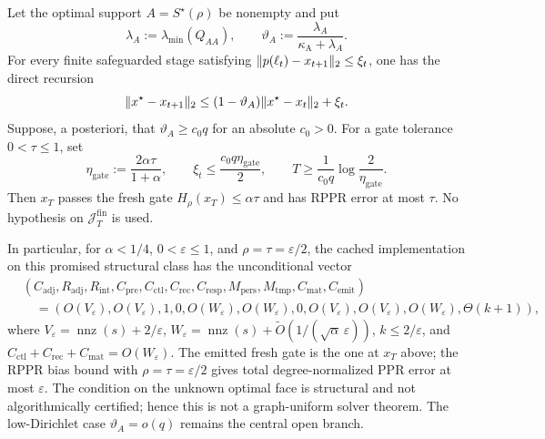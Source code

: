 \begin{theorem}
\label{thm:aesp-cd-high-dirichlet-branch}
Let the optimal support $A=S^\star(\rho)$ be nonempty and put
\begin{equation}
 \lambda_A:=\lambda_{\min}(Q_{AA}),
 \qquad
 \vartheta_A:=\frac{\lambda_A}
                    {\kappa_{\mathrm A}+\lambda_A}.
 \label{eq:aesp-cd-high-dirichlet-parameter}
\end{equation}
For every finite safeguarded stage satisfying
$\lVert p(\ell_t)-x_{t+1}\rVert_2\leq\xi_t$, one has the direct recursion
\begin{equation}
 \lVert x^\star-x_{t+1}\rVert_2
 \leq(1-\vartheta_A)\lVert x^\star-x_t\rVert_2+\xi_t.
 \label{eq:aesp-cd-high-dirichlet-recursion}
\end{equation}
Suppose, a posteriori, that
$\vartheta_A\geq c_0q$ for an absolute $c_0>0$.  For a gate tolerance
$0<\tau\leq1$, set
\begin{equation*}
 \eta_{\mathrm{gate}}:=\frac{2\alpha\tau}{1+\alpha},
 \qquad
 \xi_t\leq\frac{c_0q\eta_{\mathrm{gate}}}{2},
 \qquad
 T\geq\frac1{c_0q}
       \log\frac{2}{\eta_{\mathrm{gate}}}.
\end{equation*}
Then $x_T$ passes the fresh gate
$H_\rho(x_T)\leq\alpha\tau$ and has RPPR error at most $\tau$.
No hypothesis on $\mathcal J_T^{\mathrm{fin}}$ is used.

In particular, for $\alpha<1/4$, $0<\varepsilon\leq1$, and
$\rho=\tau=\varepsilon/2$, the cached implementation on this promised
structural class has the unconditional vector
\begin{equation}
 \begin{split}
 &(C_{\mathrm{adj}},R_{\mathrm{adj}},R_{\mathrm{int}},C_{\mathrm{pre}},
 C_{\mathrm{ctl}},C_{\mathrm{rec}},C_{\mathrm{resp}},M_{\mathrm{pers}},
 M_{\mathrm{tmp}},C_{\mathrm{mat}},C_{\mathrm{emit}})\\
 &\quad=
 (O(V_\varepsilon),O(V_\varepsilon),1,0,
 O(W_\varepsilon),O(W_\varepsilon),0,
 O(V_\varepsilon),O(V_\varepsilon),O(W_\varepsilon),\Theta(k+1)),
 \end{split}
 \label{eq:aesp-cd-high-dirichlet-vector}
\end{equation}
where
$V_\varepsilon=\operatorname{nnz}(s)+2/\varepsilon$,
$W_\varepsilon=\operatorname{nnz}(s)
+\widetilde O(1/(\sqrt\alpha\,\varepsilon))$,
$k\leq2/\varepsilon$, and
$C_{\mathrm{ctl}}+C_{\mathrm{rec}}+C_{\mathrm{mat}}=O(W_\varepsilon)$.
The emitted fresh gate is the one at $x_T$ above; the RPPR bias bound with
$\rho=\tau=\varepsilon/2$ gives total degree-normalized PPR error at most
$\varepsilon$.
The condition on the unknown optimal face is structural and not
algorithmically certified; hence this is not a graph-uniform solver theorem.
The low-Dirichlet case $\vartheta_A=o(q)$ remains the central open branch.
\end{theorem}

